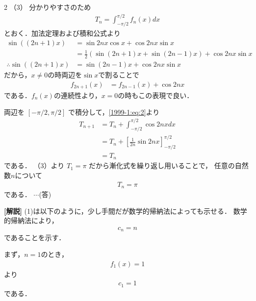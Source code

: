 \documentclass[../../../../main.tex]{subfiles}
\begin{document}
\begin{multicols}{2}
    \vspace{10pt}
    （3）
    分かりやすさのため
    \begin{align}
        T_n = \int_{-\pi/2}^{\pi/2} f_n(x) dx \label{1999-1:eq:2}
    \end{align}
    とおく．加法定理および積和公式より
    \begin{align*}
        \sin\left((2n+1)x\right)
         & = \sin 2nx \cos x + \cos 2nx \sin x                                   \\
         & = \frac{1}{2}\left(\sin(2n+1)x + \sin(2n-1)x\right) + \cos 2nx \sin x \\
        \therefore
        \sin\left((2n+1)x\right)
         & = \sin(2n-1)x + \cos 2nx \sin x
    \end{align*}
    だから，$x\neq 0$の時両辺を$\sin x$で割ることで
    \begin{align*}
        f_{2n+1}(x) & = f_{2n-1}(x) + \cos 2nx
    \end{align*}
    である．$f_{n}(x)$の連続性より，$x= 0$の時もこの表現で良い．

    両辺を $[- \pi/2, \pi/2]$ で積分して，\cref{1999-1:eq:2}より
    \begin{align*}
        T_{n+1}
         & = T_n + \int_{-\pi/2}^{\pi/2} \cos 2nx dx                  \\
         & = T_n + \left[\frac{1}{2n}\sin 2nx\right]_{-\pi/2}^{\pi/2} \\
         & = T_n
    \end{align*}
    である．
    （3）より $T_1 = \pi$ だから漸化式を繰り返し用いることで，
    任意の自然数$n$について
    \begin{align*}
        T_n=\pi
    \end{align*}
    である． $\cdots$(答)

    \vspace{10pt}
    {\bf[解説]}
    (1)は以下のように，少し手間だが数学的帰納法によっても示せる．
    数学的帰納法により，
    \begin{align}
        c_{n} = n \label{1999-1:eq:1}
    \end{align}
    であることを示す．

    まず，$n=1$のとき，
    \begin{align*}
        f_{1}(x) = 1
    \end{align*}
    より
    \begin{align*}
        c_{1} = 1
    \end{align*}
    である．


\end{multicols}
\end{document}
